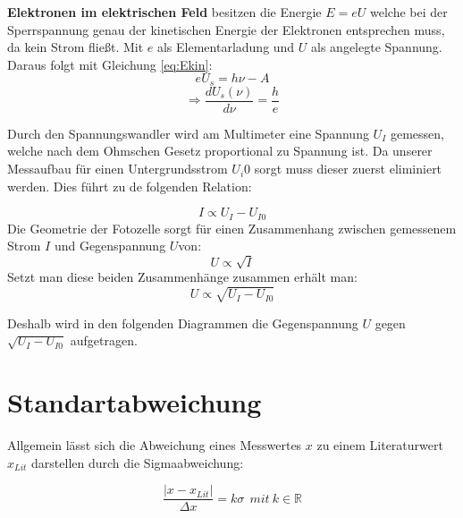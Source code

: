 \textbf{Elektronen im elektrischen Feld} besitzen die Energie $E = e U$ welche bei der Sperrspannung genau der kinetischen Energie der Elektronen entsprechen muss, da kein Strom fließt.
Mit $e$ als Elementarladung und $U$ als angelegte Spannung.
Daraus folgt mit Gleichung \ref{eq:Ekin}:
\begin{equation}
    eU_s = h \nu - A
\end{equation}
\begin{equation}
    \Rightarrow\frac{d U_s (\nu)}{d \nu} = \frac{h}{e}
    \label{eq:hfertig}
\end{equation}

Durch den Spannungswandler wird am Multimeter eine Spannung $U_I$ gemessen, welche nach dem Ohmschen Gesetz proportional zu Spannung ist.
Da unserer Messaufbau für einen Untergrundsstrom $U_i0$ sorgt muss dieser zuerst eliminiert werden. Dies führt zu de folgenden Relation:

\begin{equation}
    I \propto U_I - U_{I0}
\end{equation}
Die Geometrie der Fotozelle sorgt für einen Zusammenhang zwischen gemessenem Strom $I$ und Gegenspannung $U$von:
\begin{equation}
    U \propto \sqrt{I} 
\end{equation}
Setzt man diese beiden Zusammenhänge zusammen erhält man:
\begin{equation}
    U \propto \sqrt{U_I - U_{I0}} 
\end{equation}

Deshalb wird in den folgenden Diagrammen die Gegenspannung $U$ gegen $\sqrt{U_I - U_{I0}}$ aufgetragen.

\section{Standartabweichung}
Allgemein lässt sich die Abweichung eines Messwertes $x$ zu einem Literaturwert $x_{Lit}$ darstellen durch die Sigmaabweichung:

\begin{equation}
    \frac{|x-x_{Lit}|}{\Delta x} = k \sigma \ \ mit \ k \in \mathbb{R}
    \label{eq:sigma}
\end{equation}
